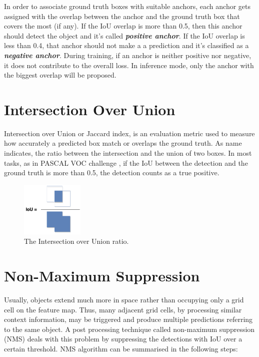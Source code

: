 In order to associate ground truth boxes with suitable anchors, each anchor gets assigned with the overlap between the anchor and the ground truth box that covers the most (if any). If the IoU overlap is more than 0.5, then this anchor should detect the object and it's called \textbf{\textit{positive anchor}}. If the IoU overlap is less than 0.4, that anchor should not make a a prediction and it's classified as a \textbf{\textit{negative anchor}}. During training, if an anchor is neither positive nor negative, it does not contribute to the overall loss. In inference mode, only the anchor with the biggest overlap will be proposed.

\section{Intersection Over Union}
Intersection over Union or Jaccard index, is an evaluation metric used to measure how accurately a predicted box match or overlaps the ground truth. As name indicates, the ratio between the intersection and the union of two boxes. In most tasks, as in PASCAL VOC challenge \cite{everingham2010pascal}, if the IoU between the detection and the ground truth is more than 0.5, the detection counts as a true positive.

\begin{figure}[!htb]
  \centering
  \includegraphics[width=3cm]{images/ch2/fig8.png}
  \caption{The Intersection over Union ratio.}
  \label{fig8}
\end{figure} 

\section{Non-Maximum Suppression}
Usually, objects extend much more in space rather than occupying only a grid cell on the feature map. Thus, many adjacent grid cells, by processing similar context information, may be triggered and produce multiple predictions referring to the same object. A post processing technique called non-maximum suppression (NMS) deals with this problem by suppressing the detections with IoU over a certain threshold. NMS algorithm can be summarised in the following steps:

